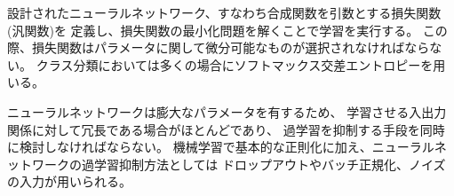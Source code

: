 設計されたニューラルネットワーク、すなわち合成関数を引数とする損失関数(汎関数)を
定義し、損失関数の最小化問題を解くことで学習を実行する。
この際、損失関数はパラメータに関して微分可能なものが選択されなければならない。
クラス分類においては多くの場合にソフトマックス交差エントロピーを用いる。

ニューラルネットワークは膨大なパラメータを有するため、
学習させる入出力関係に対して冗長である場合がほとんどであり、
過学習を抑制する手段を同時に検討しなければならない。
機械学習で基本的な正則化に加え、ニューラルネットワークの過学習抑制方法としては
ドロップアウトやバッチ正規化、ノイズの入力が用いられる。



